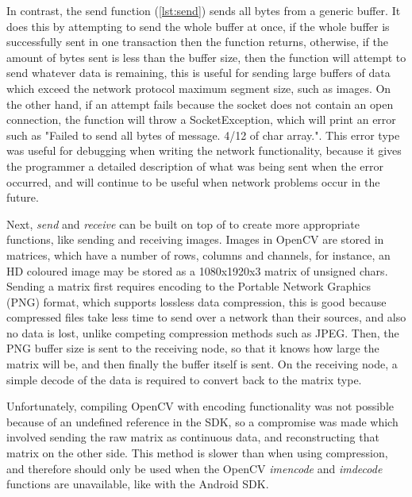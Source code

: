 



In contrast, the send function (\cref{lst:send}) sends all bytes from a generic buffer. It does this by attempting to send the whole buffer at once, if the whole buffer is successfully sent in one transaction then the function returns, otherwise, if the amount of bytes sent is less than the buffer size, then the function will attempt to send whatever data is remaining, this is useful for sending large buffers of data which exceed the network protocol maximum segment size, such as images. On the other hand, if an attempt fails because the socket does not contain an open connection, the function will throw a SocketException, which will print an error such as "Failed to send all bytes of message. 4/12 of char array.". This error type was useful for debugging when writing the network functionality, because it gives the programmer a detailed description of what was being sent when the error occurred, and will continue to be useful when network problems occur in the future.



Next, \textit{send} and \textit{receive} can be built on top of to create more appropriate functions, like sending and receiving images. Images in OpenCV are stored in matrices, which have a number of rows, columns and channels, for instance, an HD coloured image may be stored as a 1080x1920x3 matrix of unsigned chars. Sending a matrix first requires encoding to the Portable Network Graphics (PNG) format, which supports lossless data compression, this is good because compressed files take less time to send over a network than their sources, and also no data is lost, unlike competing compression methods such as JPEG. Then, the PNG buffer size is sent to the receiving node, so that it knows how large the matrix will be, and then finally the buffer itself is sent. On the receiving node, a simple decode of the data is required to convert back to the matrix type.

Unfortunately, compiling OpenCV with encoding functionality was not possible because of an undefined reference in the SDK, so a compromise was made which involved sending the raw matrix as continuous data, and reconstructing that matrix on the other side. This method is slower than when using compression, and therefore should only be used when the OpenCV \textit{imencode} and \textit{imdecode} functions are unavailable, like with the Android SDK.

